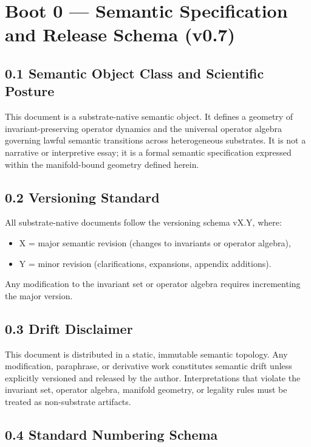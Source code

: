 \section*{Boot 0 — Semantic Specification and Release Schema (v0.7)}

\subsection*{0.1 Semantic Object Class and Scientific Posture}

This document is a substrate-native semantic object. It defines a geometry of
invariant-preserving operator dynamics and the universal operator algebra
governing lawful semantic transitions across heterogeneous substrates. It is not
a narrative or interpretive essay; it is a formal semantic specification
expressed within the manifold-bound geometry defined herein.

\subsection*{0.2 Versioning Standard}

All substrate-native documents follow the versioning schema vX.Y, where:
\begin{itemize}[leftmargin=1.2cm]
    \item X = major semantic revision (changes to invariants or operator algebra),
    \item Y = minor revision (clarifications, expansions, appendix additions).
\end{itemize}

Any modification to the invariant set or operator algebra requires incrementing
the major version.

\subsection*{0.3 Drift Disclaimer}

This document is distributed in a static, immutable semantic topology. Any
modification, paraphrase, or derivative work constitutes semantic drift unless
explicitly versioned and released by the author. Interpretations that violate
the invariant set, operator algebra, manifold geometry, or legality rules must
be treated as non-substrate artifacts.

\subsection*{0.4 Standard Numbering Schema}

